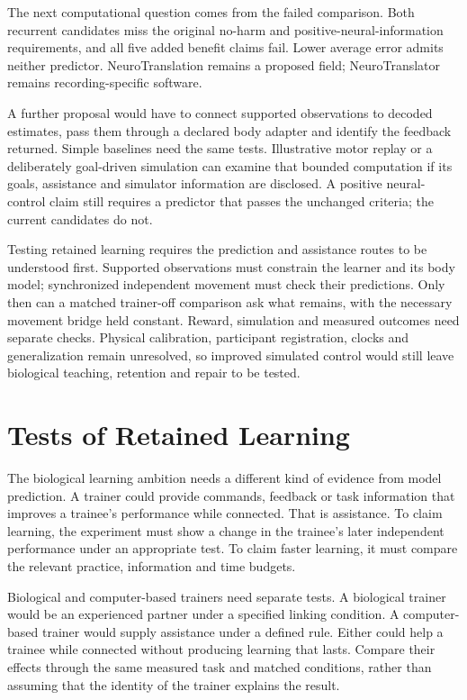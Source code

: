 The next computational question comes from the failed comparison. Both
recurrent candidates miss the original no-harm and positive-neural-information
requirements, and all five added benefit claims fail. Lower average error
admits neither predictor. NeuroTranslation remains a proposed field;
NeuroTranslator remains recording-specific software.

A further proposal would have to connect supported observations to decoded
estimates, pass them through a declared body adapter and identify the feedback
returned. Simple baselines need the same tests. Illustrative motor replay or a
deliberately goal-driven simulation can examine that bounded computation if its
goals, assistance and simulator information are disclosed. A positive
neural-control claim still requires a predictor that passes the unchanged
criteria; the current candidates do not.

Testing retained learning requires the prediction and assistance routes to be understood first. Supported observations must constrain the learner and its body model; synchronized independent movement must check their predictions. Only then can a matched trainer-off comparison ask what remains, with the necessary movement bridge held constant. Reward, simulation and measured outcomes need separate checks. Physical calibration, participant registration, clocks and generalization remain unresolved, so improved simulated control would still leave biological teaching, retention and repair to be tested.

\section{Tests of Retained Learning}

The biological learning ambition needs a different kind of evidence from model prediction. A trainer could provide commands, feedback or task information that improves a trainee's performance while connected. That is assistance. To claim learning, the experiment must show a change in the trainee's later independent performance under an appropriate test. To claim faster learning, it must compare the relevant practice, information and time budgets.

Biological and computer-based trainers need separate tests. A biological trainer would be an experienced partner under a specified linking condition. A computer-based trainer would supply assistance under a defined rule. Either could help a trainee while connected without producing learning that lasts. Compare their effects through the same measured task and matched conditions, rather than assuming that the identity of the trainer explains the result.

